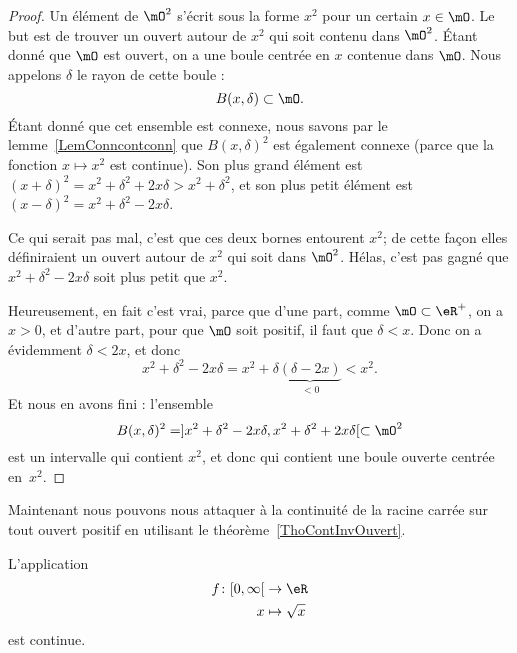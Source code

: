 \begin{proof}
	Un élément de \( \mO^2\) s'écrit sous la forme \( x^2\) pour un certain \( x\in\mO\). Le but est de trouver un ouvert autour de \( x^2\) qui soit contenu dans \( \mO^2\). Étant donné que \( \mO\) est ouvert, on a une boule centrée en \( x\) contenue dans \( \mO\). Nous appelons \( \delta\) le rayon de cette boule :
	\[
		B(x,\delta)\subset\mO.
	\]
	Étant donné que cet ensemble est connexe, nous savons par le lemme~\ref{LemConncontconn} que \( B(x,\delta)^2\) est également connexe (parce que la fonction \( x\mapsto x^2\) est continue). Son plus grand élément est \( (x+\delta)^2=x^2+\delta^2+2x\delta>x^2+\delta^2\), et son plus petit élément est \( (x-\delta)^2=x^2+\delta^2-2x\delta\).

	Ce qui serait pas mal, c'est que ces deux bornes entourent \( x^2\); de cette façon elles définiraient un ouvert autour de \( x^2\) qui soit dans \( \mO^2\). Hélas, c'est pas gagné que \( x^2+\delta^2-2x\delta\) soit plus petit que \( x^2\).

	Heureusement, en fait c'est vrai, parce que d'une part, comme \( \mO\subset\eR^+\), on a \( x>0\), et d'autre part, pour que \( \mO\) soit positif, il faut que \( \delta<x\). Donc on a évidemment \( \delta<2x\), et donc
	\[
		x^2+\delta^2-2x\delta=x^2+\delta\underbrace{(\delta-2x)}_{<0}<x^2.
	\]
	Et nous en avons fini : l'ensemble
	\[
		B(x,\delta)^2=]x^2+\delta^2-2x\delta,x^2+\delta^2+2x\delta[\subset\mO^2
	\]
	est un intervalle qui contient \( x^2\), et donc qui contient une boule ouverte centrée en~\( x^2\).
\end{proof}

Maintenant nous pouvons nous attaquer à la continuité de la racine carrée sur tout ouvert positif en utilisant le théorème~\ref{ThoContInvOuvert}.

\begin{proposition}
	L'application
	\begin{equation}
		\begin{aligned}
			f\colon \mathopen[ 0,\infty\mathclose[ & \to \eR            \\
			x                                      & \mapsto \sqrt{ x }
		\end{aligned}
	\end{equation}
	est continue.
\end{proposition}

